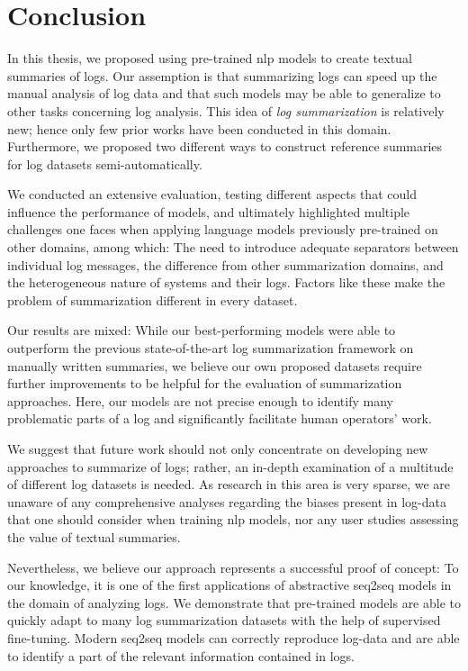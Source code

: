 \chapter{Conclusion}\label{ch:conclusion}

\acresetall


In this thesis, we proposed using pre-trained \ac{nlp} models to create textual summaries of logs.
Our assemption is that summarizing logs can speed up the manual analysis of log data and
that such models may be able to generalize to other tasks concerning log analysis.
This idea of \emph{log summarization} is relatively new; hence only few prior works have been conducted in this domain.
Furthermore, we proposed two different ways to construct reference summaries for log datasets semi-automatically.

We conducted an extensive evaluation, testing different aspects that could influence the performance of models,
and ultimately highlighted multiple challenges one faces when applying language models previously pre-trained on other domains, among which:
The need to introduce adequate separators between individual log messages,
the difference from other summarization domains, and the heterogeneous nature of systems and their logs.
Factors like these make the problem of summarization different in every dataset.

Our results are mixed:
While our best-performing models were able to outperform the previous state-of-the-art log summarization framework on manually written summaries,
we believe our own proposed datasets require further improvements to be helpful for the evaluation of summarization approaches.
Here, our models are not precise enough to identify many problematic parts of a log
and significantly facilitate human operators' work.

We suggest that future work should not only concentrate on developing new approaches to summarize of logs;
rather, an in-depth examination of a multitude of different log datasets is needed.
As research in this area is very sparse,
we are unaware of any comprehensive analyses regarding the biases present in log-data that one should consider when training \ac{nlp} models,
nor any user studies assessing the value of textual summaries.

Nevertheless, we believe our approach represents a successful proof of concept:
To our knowledge, it is one of the first applications of abstractive \acl{seq2seq} models in the domain of analyzing logs.
We demonstrate that pre-trained models are able to quickly adapt to many log summarization datasets with the help of supervised fine-tuning.
Modern \acl{seq2seq} models can correctly reproduce log-data
and are able to identify a part of the relevant information contained in logs.
